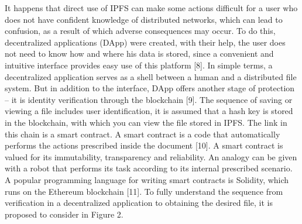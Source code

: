 \documentclass[10pt,conference,a4paper]{IEEEtran_EDM}
\begin{document}
It happens that direct use of IPFS can make some actions difficult for a user who does not have confident knowledge of distributed networks, which can lead to confusion, as a result of which adverse consequences may occur. To do this, decentralized applications (DApp) were created, with their help, the user does not need to know how and where his data is stored, since a convenient and intuitive interface provides easy use of this platform [8]. In simple terms, a decentralized application serves as a shell between a human and a distributed file system. But in addition to the interface, DApp offers another stage of protection – it is identity verification through the blockchain [9]. The sequence of saving or viewing a file includes user identification, it is assumed that a hash key is stored in the blockchain, with which you can view the file stored in IPFS. The link in this chain is a smart contract. A smart contract is a code that automatically performs the actions prescribed inside the document [10]. A smart contract is valued for its immutability, transparency and reliability. An analogy can be given with a robot that performs its task according to its internal prescribed scenario. A popular programming language for writing smart contracts is Solidity, which runs on the Ethereum blockchain [11]. To fully understand the sequence from verification in a decentralized application to obtaining the desired file, it is proposed to consider in Figure 2.
\end{document}
